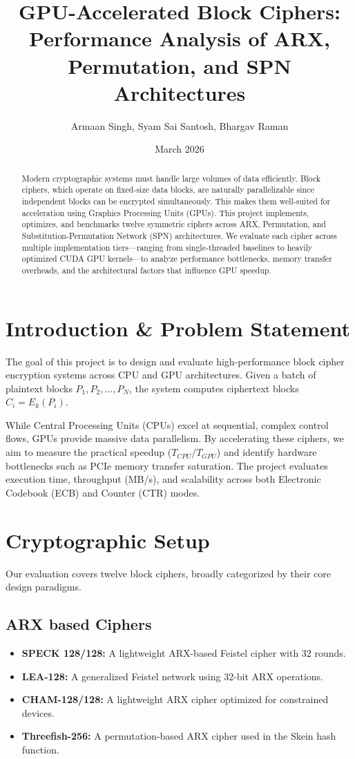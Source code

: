 \documentclass{article}
\title{GPU-Accelerated Block Ciphers: Performance Analysis of ARX, Permutation, and SPN Architectures}
\author{Armaan Singh, Syam Sai Santosh, Bhargav Raman}
\date{March 2026}
\begin{document}
\maketitle

\begin{abstract}
Modern cryptographic systems must handle large volumes of data efficiently. Block ciphers, which operate on fixed-size data blocks, are naturally parallelizable since independent blocks can be encrypted simultaneously. This makes them well-suited for acceleration using Graphics Processing Units (GPUs). This project implements, optimizes, and benchmarks twelve symmetric ciphers across ARX, Permutation, and Substitution-Permutation Network (SPN) architectures. We evaluate each cipher across multiple implementation tiers—ranging from single-threaded baselines to heavily optimized CUDA GPU kernels—to analyze performance bottlenecks, memory transfer overheads, and the architectural factors that influence GPU speedup.
\end{abstract}

\section{Introduction \& Problem Statement}

The goal of this project is to design and evaluate high-performance block cipher encryption systems across CPU and GPU architectures. Given a batch of plaintext blocks $P_1, P_2, \dots, P_N$, the system computes ciphertext blocks $C_i = E_k(P_i)$. 

While Central Processing Units (CPUs) excel at sequential, complex control flows, GPUs provide massive data parallelism. By accelerating these ciphers, we aim to measure the practical speedup ($T_{CPU}/T_{GPU}$) and identify hardware bottlenecks such as PCIe memory transfer saturation. The project evaluates execution time, throughput (MB/s), and scalability across both Electronic Codebook (ECB) and Counter (CTR) modes.

\section{Cryptographic Setup}

Our evaluation covers twelve block ciphers, broadly categorized by their core design paradigms.

\subsection{ARX based Ciphers}
\begin{itemize}
    \item \textbf{SPECK 128/128:} A lightweight ARX-based Feistel cipher with 32 rounds.
    \item \textbf{LEA-128:} A generalized Feistel network using 32-bit ARX operations.
    \item \textbf{CHAM-128/128:} A lightweight ARX cipher optimized for constrained devices.
    \item \textbf{Threefish-256:} A permutation-based ARX cipher used in the Skein hash function.
\end{itemize}
\end{document}
